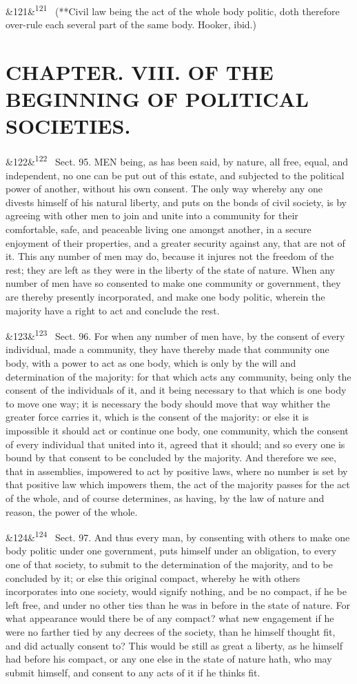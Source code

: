 \documentclass[12pt]{article}
\newcommand{\para}[1][]{\par\noindent\ifx&#1&\else\textsuperscript{\footnotesize #1}~\fi}
\begin{document}
\para[121] (**Civil law being the act of the whole body politic, doth therefore over-rule each several part of the same body. Hooker, ibid.)

\section*{CHAPTER. VIII. OF THE BEGINNING OF POLITICAL SOCIETIES.}

\para[122] Sect. 95. MEN being, as has been said, by nature, all free, equal, and independent, no one can be put out of this estate, and subjected to the political power of another, without his own consent. The only way whereby any one divests himself of his natural liberty, and puts on the bonds of civil society, is by agreeing with other men to join and unite into a community for their comfortable, safe, and peaceable living one amongst another, in a secure enjoyment of their properties, and a greater security against any, that are not of it. This any number of men may do, because it injures not the freedom of the rest; they are left as they were in the liberty of the state of nature. When any number of men have so consented to make one community or government, they are thereby presently incorporated, and make one body politic, wherein the majority have a right to act and conclude the rest.

\para[123] Sect. 96. For when any number of men have, by the consent of every individual, made a community, they have thereby made that community one body, with a power to act as one body, which is only by the will and determination of the majority: for that which acts any community, being only the consent of the individuals of it, and it being necessary to that which is one body to move one way; it is necessary the body should move that way whither the greater force carries it, which is the consent of the majority: or else it is impossible it should act or continue one body, one community, which the consent of every individual that united into it, agreed that it should; and so every one is bound by that consent to be concluded by the majority. And therefore we see, that in assemblies, impowered to act by positive laws, where no number is set by that positive law which impowers them, the act of the majority passes for the act of the whole, and of course determines, as having, by the law of nature and reason, the power of the whole.

\para[124] Sect. 97. And thus every man, by consenting with others to make one body politic under one government, puts himself under an obligation, to every one of that society, to submit to the determination of the majority, and to be concluded by it; or else this original compact, whereby he with others incorporates into one society, would signify nothing, and be no compact, if he be left free, and under no other ties than he was in before in the state of nature. For what appearance would there be of any compact? what new engagement if he were no farther tied by any decrees of the society, than he himself thought fit, and did actually consent to? This would be still as great a liberty, as he himself had before his compact, or any one else in the state of nature hath, who may submit himself, and consent to any acts of it if he thinks fit.
\end{document}
